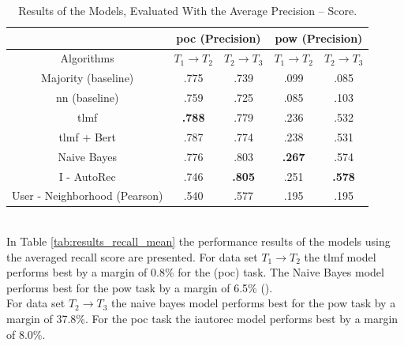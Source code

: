 \begin{table}[h!]
    \centering
    \begin{tabular}{|c|c|c|c|c|}
    \hline
     & \multicolumn{2}{|c|}{\acrshort{poc} (Precision)} & \multicolumn{2}{|c|}{\acrshort{pow} (Precision)} \\
     \hline
    Algorithms & $T_1 \to T_2$ & $T_2 \to T_3$ & $T_1 \to T_2$ & $T_2 \to T_3$\\
    \hline  Majority (baseline) & .775 & .739 & .099 & .085 \\ 
    \acrshort{nn} (baseline) & .759 & .725 & .085 & .103\\
    \acrshort{tlmf} & \textbf{.788} & .779 & .236 & .532 \\
    \acrshort{tlmf} + Bert & .787 & .774 & .238 & .531\\
    Naive Bayes & .776 & .803 & \textbf{.267} & .574 \\
    I - AutoRec & .746 & \textbf{.805} & .251 & \textbf{.578}\\
    User - Neighborhood (Pearson) & .540 & .577 & .195 & .195\\
    \hline
    \end{tabular}
    \caption{Results of the Models, Evaluated With the Average Precision – Score.}
    \label{tab:results_precision_mean}
\end{table}\\

\noindent In Table \ref{tab:results_recall_mean} the performance results of the models using the averaged recall score are presented. For data set $T_1 \to T_2$ the \acrshort{tlmf} model performs best by a margin of 0.8\% for the (\acrshort{poc}) task. The Naive Bayes model performs best for the \acrshort{pow} task by a margin of 6.5\% (). \\
For data set $T_2 \to T_3$ the naive bayes model performs best for the \acrshort{pow} task by a margin of 37.8\%. For the \acrshort{poc} task the \acrshort{iautorec} model performs best by a margin of 8.0\%.

